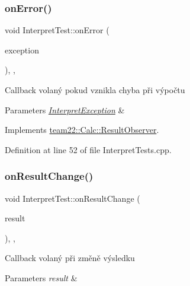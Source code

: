 \subsubsection{\texorpdfstring{on\+Error()}{onError()}}
{\footnotesize\ttfamily void Interpret\+Test\+::on\+Error (\begin{DoxyParamCaption}\item[{\hyperlink{class_interpret_exception}{Interpret\+Exception}}]{exception }\end{DoxyParamCaption})\hspace{0.3cm}{\ttfamily [inline]}, {\ttfamily [override]}, {\ttfamily [virtual]}}

Callback volaný pokud vznikla chyba při výpočtu 
\begin{DoxyParams}{Parameters}
{\em \hyperlink{class_interpret_exception}{Interpret\+Exception}} & \\
\hline
\end{DoxyParams}


Implements \hyperlink{classteam22_1_1_calc_1_1_result_observer_ad36cf8df89853d60f91094800c01d329}{team22\+::\+Calc\+::\+Result\+Observer}.



Definition at line 52 of file Interpret\+Tests.\+cpp.

\mbox{\label{struct_interpret_test_af3c7dfecc5779919bf629c558c696548}} 
\subsubsection{\texorpdfstring{on\+Result\+Change()}{onResultChange()}}
{\footnotesize\ttfamily void Interpret\+Test\+::on\+Result\+Change (\begin{DoxyParamCaption}\item[{\hyperlink{classteam22_1_1_math_1_1_number}{Number}}]{result }\end{DoxyParamCaption})\hspace{0.3cm}{\ttfamily [inline]}, {\ttfamily [override]}, {\ttfamily [virtual]}}

Callback volaný při změně výsledku 
\begin{DoxyParams}{Parameters}
{\em result} & \\
\hline
\end{DoxyParams}


